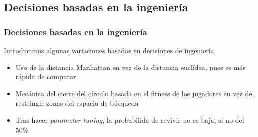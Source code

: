 \documentclass{beamer}
\begin{document}
\subsection{Decisiones basadas en la ingeniería}

\begin{frame}
    \frametitle{Decisiones basadas en la ingeniería}

    Introducimos algunas variaciones basadas en decisiones de ingeniería

    \begin{itemize}
        \item Uso de la distancia Manhattan en vez de la distancia euclídea, pues es más rápida de computar
        \item Mecánica del cierre del círculo basada en el fitness de los jugadores en vez del restringir zonas del espacio de búsqueda
        \item Tras hacer \emph{parameter tuning}, la probabilida de revivir no es baja, si no del 50\%
    \end{itemize}
\end{frame}
\end{document}
